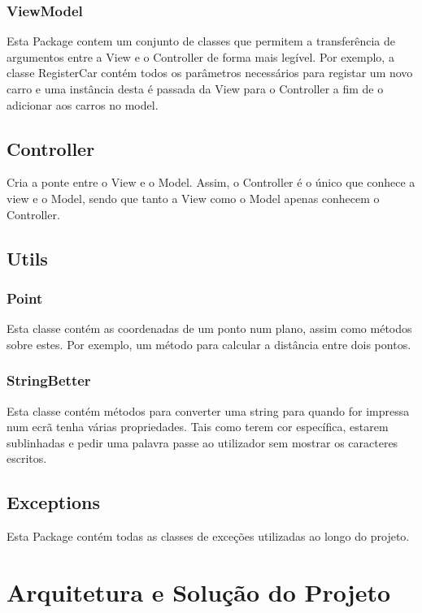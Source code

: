 \documentclass[a4paper]{report}
\begin{document}
\subsection{ViewModel}

Esta Package contem um conjunto de classes que permitem a transferência de argumentos
entre a View e o Controller de forma mais legível. Por exemplo, a classe RegisterCar
contém todos os parâmetros necessários para registar um novo carro e uma instância desta
é passada da View para o Controller a fim de o adicionar aos carros no model.

\section{Controller}

Cria a ponte entre o View e o Model. Assim, o Controller é o único que conhece a view e o
Model, sendo que tanto a View como o Model apenas conhecem o Controller.

\section{Utils}

\subsection{Point}

Esta classe contém as coordenadas de um ponto num plano, assim como métodos sobre estes.
Por exemplo, um método para calcular a distância entre dois pontos.

\subsection{StringBetter}

Esta classe contém métodos para converter uma string para quando for
impressa num ecrã tenha várias propriedades. Tais como terem cor
específica, estarem sublinhadas e pedir uma palavra passe ao utilizador sem mostrar
os caracteres escritos.

\section{Exceptions}

Esta Package contém todas as classes de exceções utilizadas ao longo do projeto.

\chapter{Arquitetura e Solução do Projeto}
\end{document}
